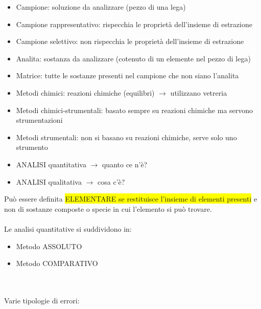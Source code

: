 \documentclass{article}
\begin{document}
\hrulefill

\begin{itemize}
	\item Campione: soluzione da analizzare (pezzo di una lega)
	\item Campione rappresentativo: rispecchia le proprietà dell'insieme di estrazione
	\item Campione selettivo: non rispecchia le proprietà dell'insieme di estrazione
	\item Analita: sostanza da analizzare (cotenuto di un elemente nel pezzo di lega)
	\item Matrice: tutte le sostanze presenti nel campione che non siano l'analita
\end{itemize}
\hrulefill
\begin{itemize}
	\item Metodi chimici: reazioni chimiche (equilibri) $\rightarrow$ utilizzano vetreria
	\item Metodi chimici-strumentali: basato sempre su reazioni chimiche ma servono strumentazioni
	\item Metodi strumentali: non si basano su reazioni chimiche, serve solo uno strumento
\end{itemize}
\hrulefill
\begin{itemize}
	\item ANALISI quantitativa $\rightarrow$ quanto ce n'è?
	\item ANALISI qualitativa $\rightarrow$ cosa c'è?
\end{itemize}
%	
Può essere definita \colorbox{yellow}{ELEMENTARE se restituisce l'insieme di elementi presenti} e non di sostanze composte o specie in cui l'elemento si può trovare.
\\\\
Le analisi quantitative si suddividono in:
\begin{itemize}
	\item Metodo ASSOLUTO
	\item Metodo COMPARATIVO
\end{itemize} 
\hrulefill
\\\\Varie tipologie di errori:
\end{document}
